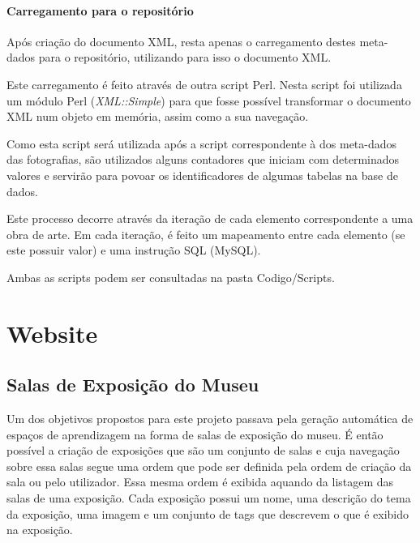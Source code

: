 \documentclass[letterpaper]{article}
\begin{document}
\paragraph[Carregamento para o reposit\'orio]{
Carregamento para o reposit\'orio}
{
Ap\'os cria\c{c}\~ao do documento XML, resta apenas o carregamento
destes meta-dados para o reposit\'orio, utilizando para isso o
documento XML.}

{
Este carregamento \'e feito atrav\'es de outra script Perl. Nesta script
foi utilizada um m\'odulo Perl (\textit{XML::Simple}) para que fosse
poss\'ivel transformar o documento XML num objeto em mem\'oria, assim
como a sua navega\c{c}\~ao.}

{
Como esta script ser\'a utilizada ap\'os a script correspondente \`a dos
meta-dados das fotografias, s\~ao utilizados alguns contadores que
iniciam com determinados valores e servir\~ao para povoar os
identificadores de algumas tabelas na base de dados.}

{
Este processo decorre atrav\'es da itera\c{c}\~ao de cada elemento
correspondente a uma obra de arte. Em cada itera\c{c}\~ao, \'e feito um
mapeamento entre cada elemento (se este possuir valor) e uma
instru\c{c}\~ao SQL (MySQL).}


\bigskip

{
Ambas as scripts podem ser consultadas na pasta Codigo/Scripts.}


\bigskip

\section[Website]{ Website}
\subsection[Salas de Exposi\c{c}\~ao do Museu]{
Salas de Exposi\c{c}\~ao do Museu}
{
Um dos objetivos propostos para este projeto passava pela gera\c{c}\~ao
autom\'atica de espa\c{c}os de aprendizagem na forma de salas de
exposi\c{c}\~ao do museu. \'E ent\~ao poss\'ivel a cria\c{c}\~ao de
exposi\c{c}\~oes que s\~ao um conjunto de salas e cuja navega\c{c}\~ao
sobre essa salas segue uma ordem que pode ser definida pela ordem de
cria\c{c}\~ao da sala ou pelo utilizador. Essa mesma ordem \'e exibida
aquando da listagem das salas de uma exposi\c{c}\~ao. Cada
exposi\c{c}\~ao possui um nome, uma descri\c{c}\~ao do tema da
exposi\c{c}\~ao, uma imagem e um conjunto de tags que descrevem o que
\'e exibido na exposi\c{c}\~ao. }
\end{document}
